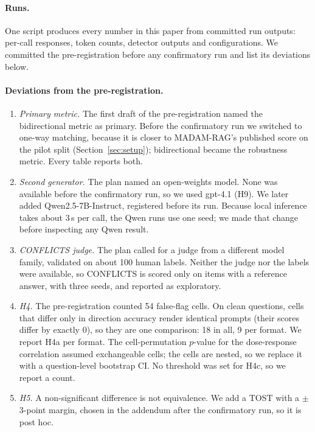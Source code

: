 \label{app:repro}
\paragraph{Runs.} One script produces every number in this paper from committed run outputs: per-call responses,
token counts, detector outputs and configurations. We committed the pre-registration before any confirmatory run and
list its deviations below.

\paragraph{Deviations from the pre-registration.}
\begin{enumerate}[leftmargin=*,itemsep=1pt,topsep=2pt]
\item \emph{Primary metric.} The first draft of the pre-registration named the bidirectional metric as primary. Before
the confirmatory run we switched to one-way matching, because it is closer to MADAM-RAG's published score on the pilot
split (Section~\ref{sec:setup}); bidirectional became the robustness metric. Every table reports both.
\item \emph{Second generator.} The plan named an open-weights model. None was available before the confirmatory run, so
we used gpt-4.1 (H9). We later added Qwen2.5-7B-Instruct, registered before its run. Because local inference
takes about 3\,s per call, the Qwen runs use one seed; we made that change before inspecting any Qwen result.
\item \emph{CONFLICTS judge.} The plan called for a judge from a different model family, validated on about 100 human
labels. Neither the judge nor the labels were available, so CONFLICTS is scored only on items with a reference answer,
with three seeds, and reported as exploratory.
\item \emph{H4.} The pre-registration counted 54 false-flag cells. On clean questions, cells that differ only in
direction accuracy render identical prompts (their scores differ by exactly 0), so they are one comparison: 18 in
all, 9 per format. We report H4a per format. The cell-permutation $p$-value for the dose-response correlation assumed
exchangeable cells; the cells are nested, so we replace it with a question-level bootstrap CI. No threshold was set
for H4c, so we report a count.
\item \emph{H5.} A non-significant difference is not equivalence. We add a TOST with a $\pm$3-point margin, chosen in
the addendum after the confirmatory run, so it is post hoc.

\end{enumerate}
